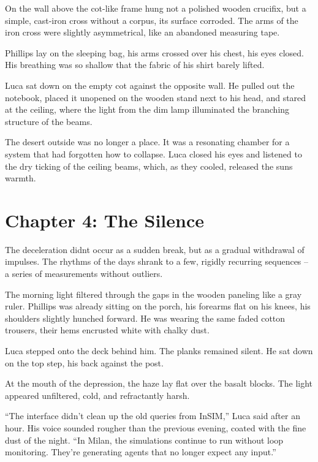\documentclass[
  ngerman,
]{article}
\begin{document}
On the wall above the cot-like frame hung not a polished wooden
crucifix, but a simple, cast-iron cross without a corpus, its surface
corroded. The arms of the iron cross were slightly asymmetrical, like an
abandoned measuring tape.

Phillips lay on the sleeping bag, his arms crossed over his chest, his
eyes closed. His breathing was so shallow that the fabric of his shirt
barely lifted.

Luca sat down on the empty cot against the opposite wall. He pulled out
the notebook, placed it unopened on the wooden stand next to his head,
and stared at the ceiling, where the light from the dim lamp illuminated
the branching structure of the beams.

The desert outside was no longer a place. It was a resonating chamber
for a system that had forgotten how to collapse. Luca closed his eyes
and listened to the dry ticking of the ceiling beams, which, as they
cooled, released the sun\textquotesingle s warmth.

\section{\texorpdfstring{\textbf{Chapter 4: The
Silence}}{Chapter 4: The Silence}}\label{chapter-4-the-silence}

The deceleration didn\textquotesingle t occur as a sudden break, but as
a gradual withdrawal of impulses. The rhythms of the days shrank to a
few, rigidly recurring sequences -- a series of measurements without
outliers.

The morning light filtered through the gaps in the wooden paneling like
a gray ruler. Phillips was already sitting on the porch, his forearms
flat on his knees, his shoulders slightly hunched forward. He was
wearing the same faded cotton trousers, their hems encrusted white with
chalky dust.

Luca stepped onto the deck behind him. The planks remained silent. He
sat down on the top step, his back against the post.

At the mouth of the depression, the haze lay flat over the basalt
blocks. The light appeared unfiltered, cold, and refractantly harsh.

``The interface didn't clean up the old queries from InSIM,'' Luca said
after an hour. His voice sounded rougher than the previous evening,
coated with the fine dust of the night. ``In Milan, the simulations
continue to run without loop monitoring. They're generating agents that
no longer expect any input.''
\end{document}
